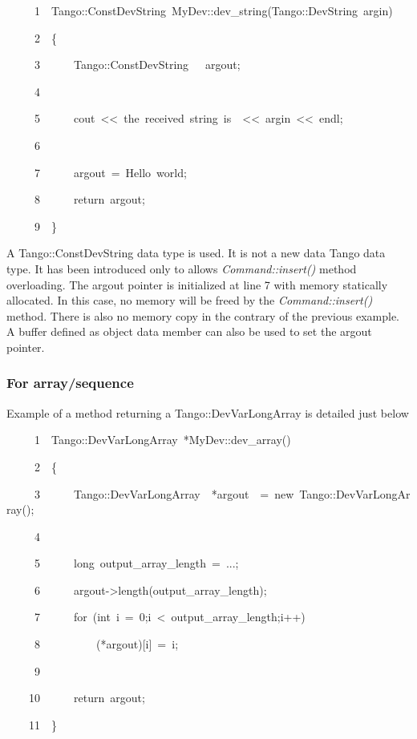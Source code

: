 
\begin{lyxcode}
~~~~~1~~Tango::ConstDevString~MyDev::dev\_string(Tango::DevString~argin)

~~~~~2~~\{

~~~~~3~~~~~~Tango::ConstDevString~~~argout;

~~~~~4~~

~~~~~5~~~~~~cout~<\textcompwordmark{}<~\textquotedbl{}the~received~string~is~\textquotedbl{}~<\textcompwordmark{}<~argin~<\textcompwordmark{}<~endl;

~~~~~6~~~~~~~~~~

~~~~~7~~~~~~argout~=~\textquotedbl{}Hello~world\textquotedbl{};~

~~~~~8~~~~~~return~argout;

~~~~~9~~\}
\end{lyxcode}


A Tango::ConstDevString data type is
used. It is not a new data Tango data type. It has been introduced
only to allows \emph{Command::insert()} method overloading. The argout
pointer is initialized at line 7 with memory statically allocated.
In this case, no memory will be freed by the \emph{Command::insert()}
method. There is also no memory copy in the contrary
of the previous example. A buffer defined as object data member can
also be used to set the argout pointer.

\subsubsection{For array/sequence}

Example of a method returning a Tango::DevVarLongArray
is detailed just below


\begin{lyxcode}
~~~~~1~~Tango::DevVarLongArray~{*}MyDev::dev\_array()

~~~~~2~~\{

~~~~~3~~~~~~Tango::DevVarLongArray~~{*}argout~~=~new~Tango::DevVarLongArray();

~~~~~4~~~~~~~~~~~~~~~~~~

~~~~~5~~~~~~long~output\_array\_length~=~...;

~~~~~6~~~~~~argout->length(output\_array\_length);

~~~~~7~~~~~~for~(int~i~=~0;i~<~output\_array\_length;i++)

~~~~~8~~~~~~~~~~({*}argout){[}i{]}~=~i;

~~~~~9~~

~~~~10~~~~~~return~argout;

~~~~11~~\}
\end{lyxcode}


